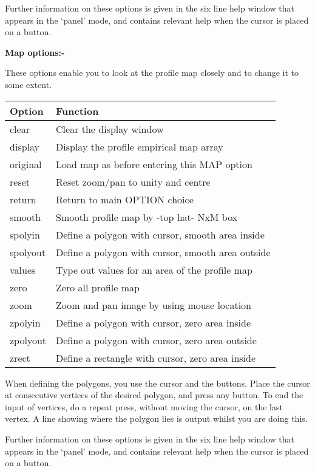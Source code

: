 \begin{small}
{{ 
 Further information on these options is given in the six line help
 window that appears in the `panel' mode, and contains relevant help
 when the cursor is placed on a button.
 
 
 {\bf \hspace*{2em} Map options:-}
 
 These options enable you to look at the profile map closely and to
 change it to some extent.
 
 \begin{tabular}{|l|p{4.5in}|}\hline
 Option & Function \\ \hline
 clear         &  Clear the display window \\
 display       &  Display the profile empirical map array \\
 original      &  Load map as before entering this MAP option \\
 reset         &  Reset zoom/pan to unity and centre \\
 return        &  Return to main OPTION choice \\
 smooth        &  Smooth profile map by -top hat- NxM box \\
 spolyin       &  Define a polygon with cursor, smooth area inside \\
 spolyout      &  Define a polygon with cursor, smooth area outside \\
 values        &  Type out values for an area of the profile map \\
 zero          &  Zero all profile map \\
 zoom          &  Zoom and pan image by using mouse location \\
 zpolyin       &  Define a polygon with cursor, zero area inside \\
 zpolyout      &  Define a polygon with cursor, zero area outside \\
 zrect         &  Define a rectangle with cursor, zero area inside \\
 \hline\end{tabular}
 
 
 When defining the polygons, you use the cursor and the
 buttons. Place the cursor at consecutive vertices of the
 desired polygon, and press any button. To end the input of
 vertices, do a repeat press, without moving the cursor, on
 the last vertex. A line showing where the polygon lies is
 output whilst you are doing this.
 
 Further information on these options is given in the six line help
 window that appears in the `panel' mode, and contains relevant help
 when the cursor is placed on a button.
 
}}
\end{small}
